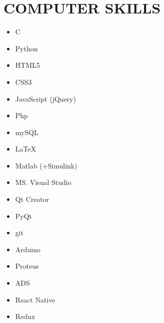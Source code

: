 \documentclass[10pt,a4paper,sans]{moderncv} %
\newcommand*{\authorimg}[1]{%
	\raisebox{-.3\baselineskip}{%
		\texttt{[image: \#1]}%
	}%
}
\begin{document}
\section{COMPUTER SKILLS}

\vspace{1em}

\begin{cvcolumns}
	{\begin{itemize}
	  		\item \authorimg{pictures/cpp.png} C\raisebox{1pt}{\tiny++}
	  		\item \authorimg{pictures/python.png} Python 
	  		\item \authorimg{pictures/html5.png} HTML5 
	  		\item \authorimg{pictures/css3.png} CSS3 
	  		\item \authorimg{pictures/js.png} JavaScript (jQuery)
	  		\item \authorimg{pictures/php.png} Php
	  		\item \authorimg{pictures/mysql.png} mySQL
	  		\item \authorimg{pictures/latex.png} \LaTeX
  		\end{itemize}}
  	
  
	{\begin{itemize}
			\item \authorimg{pictures/matlab.jpg} Matlab (+Simulink) 
	 		\item \authorimg{pictures/visual.png} MS. Visual Studio 
	 		\item \authorimg{pictures/qt.png} Qt Creator 
	 		\item \authorimg{pictures/qt.png} PyQt
	 		\item \authorimg{pictures/git.png} git 
	 		\item \authorimg{pictures/arduino.png} Arduino
	 		\item \authorimg{pictures/proteus.jpg} Proteus
	 		\item \authorimg{pictures/ads.png} ADS
	 	\end{itemize}}
 	
 	{\begin{itemize}
 			\item \authorimg{pictures/react.jpg} React Native
 			\item \authorimg{pictures/redux.png} Redux 
 	\end{itemize}}
 	
\end{cvcolumns}
\end{document}
